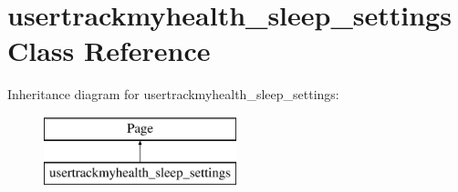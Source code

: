 \hypertarget{classusertrackmyhealth__sleep__settings}{\section{usertrackmyhealth\-\_\-sleep\-\_\-settings Class Reference}
\label{classusertrackmyhealth__sleep__settings}
}
Inheritance diagram for usertrackmyhealth\-\_\-sleep\-\_\-settings\-:\begin{figure}[H]
\begin{center}
\leavevmode
\includegraphics[height=2.000000cm]{classusertrackmyhealth__sleep__settings}
\end{center}
\end{figure}

